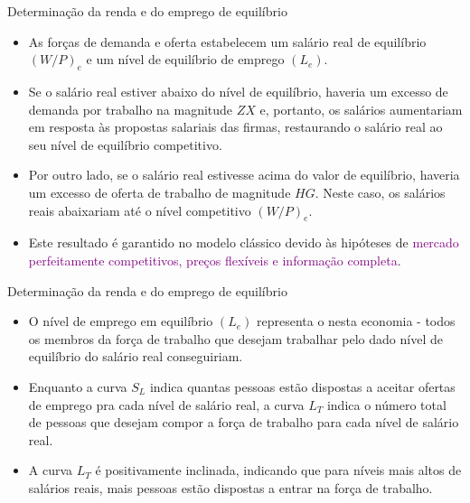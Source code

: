\documentclass[10pt]{beamer}
\begin{document}
\begin{frame}{Determinação da renda e do emprego de equilíbrio}
    \begin{itemize}
        \item As forças de demanda e oferta estabelecem um salário real de equilíbrio $(W/P)_e$ e um nível de equilíbrio de emprego $(L_e)$.\bigskip

        \item Se o salário real estiver abaixo do nível de equilíbrio, haveria um excesso de demanda por trabalho na magnitude $ZX$ e, portanto, os salários aumentariam em resposta às propostas salariais das firmas, restaurando o salário real ao seu nível de equilíbrio competitivo.\bigskip

        \item Por outro lado, se o salário real estivesse acima do valor de equilíbrio, haveria um excesso de oferta de trabalho de magnitude $HG$. Neste caso, os salários reais abaixariam até o nível competitivo $(W/P)_e$.\bigskip

        \item Este resultado é garantido no modelo clássico devido às hipóteses de \textcolor{purple}{mercado perfeitamente competitivos, pre\c{c}os flex\'{i}veis e informa\c{c}\~{a}o completa}.
    \end{itemize}
\end{frame}

\begin{frame}{Determinação da renda e do emprego de equilíbrio}
    \begin{itemize}
        \item O nível de emprego em equilíbrio $(L_e)$ representa o  nesta economia - todos os membros da força de trabalho que desejam trabalhar pelo dado nível de equilíbrio do salário real conseguiriam.\bigskip

        \item Enquanto a curva $S_L$ indica quantas pessoas estão dispostas a aceitar ofertas de emprego pra cada nível de salário real, a curva $L_T$ indica o número total de pessoas que desejam compor a força de trabalho para cada nível de salário real.\bigskip

        \item A curva $L_T$ é positivamente inclinada, indicando que para níveis mais altos de salários reais, mais pessoas estão dispostas a entrar na força de trabalho.
    \end{itemize}
\end{frame}
\end{document}
